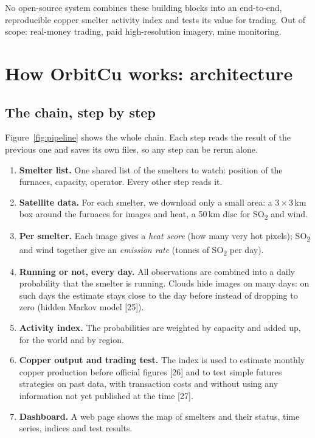 \documentclass[10pt,a4paper]{article}
\newcommand{\SOtwo}{SO\textsubscript{2}}
\begin{document}
\begin{notebox}
No open-source system combines these building blocks into an end-to-end, reproducible copper smelter activity index and tests its value for trading. Out of scope: real-money trading, paid high-resolution imagery, mine monitoring.
\end{notebox}

\section{How OrbitCu works: architecture}

\subsection{The chain, step by step}
Figure~\ref{fig:pipeline} shows the whole chain. Each step reads the result of the previous one and saves its own files, so any step can be rerun alone.

\begin{enumerate}[leftmargin=1.5em]
  \item \textbf{Smelter list.} One shared list of the smelters to watch: position of the furnaces, capacity, operator. Every other step reads it.
  \item \textbf{Satellite data.} For each smelter, we download only a small area: a 3\,$\times$\,3\,km box around the furnaces for images and heat, a 50\,km disc for \SOtwo{} and wind.
  \item \textbf{Per smelter.} Each image gives a \emph{heat score} (how many very hot pixels); \SOtwo{} and wind together give an \emph{emission rate} (tonnes of \SOtwo{} per day).
  \item \textbf{Running or not, every day.} All observations are combined into a daily probability that the smelter is running. Clouds hide images on many days: on such days the estimate stays close to the day before instead of dropping to zero (hidden Markov model [25]).
  \item \textbf{Activity index.} The probabilities are weighted by capacity and added up, for the world and by region.
  \item \textbf{Copper output and trading test.} The index is used to estimate monthly copper production before official figures [26] and to test simple futures strategies on past data, with transaction costs and without using any information not yet published at the time [27].
  \item \textbf{Dashboard.} A web page shows the map of smelters and their status, time series, indices and test results.
\end{enumerate}
\end{document}
